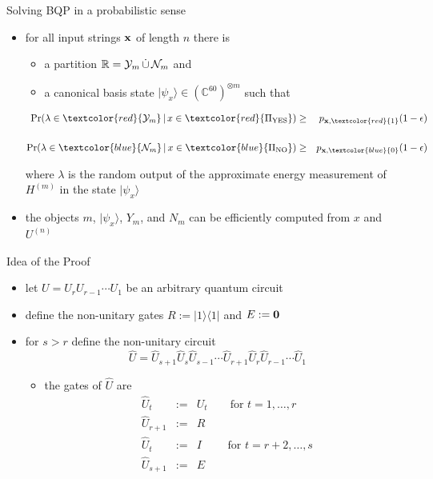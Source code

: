 \documentclass[slideColor]{prosper}
\newcommand{\C}{{\mathbb{C}}}
\renewcommand{\R}{{\mathbb{R}}}
\renewcommand{\>}{\rangle}
\newcommand{\<}{\langle}
\begin{document}
\begin{slide}{Solving BQP in a probabilistic sense}

\begin{itemize}
\item for all input strings ${\bf x}$ of length $n$ there is
  
  \begin{itemize}
  \item a partition $\R = {\cal Y}_m \, \dot{\cup} \, {\cal N}_m$ and

  \medskip
  \item a canonical basis state $|\psi_x\>\in(\C^{60})^{\otimes m}$ such that
  \end{itemize}
  \vspace{-0.5cm}
  \begin{eqnarray*}
  \Pr(\lambda\in \textcolor{red}{{\cal Y}_m}  \, | \, x\in \textcolor{red}{\Pi_{\rm YES}}) & \ge & p_{{\bf x}, \textcolor{red}{1}}  (1-\epsilon) \\ && \\
  \Pr(\lambda\in \textcolor{blue}{{\cal N}_m} \, | \, x\in \textcolor{blue}{\Pi_{\rm NO}}) & \ge & p_{{\bf x}, \textcolor{blue}{0}} (1-\epsilon) 
  \end{eqnarray*}

  where $\lambda$ is the random output of the approximate energy measurement of $H^{(m)}$ in the state $|\psi_x\>$
  
  \medskip
  \item
  the objects $m$, $|\psi_x\>$, $Y_m$, and $N_m$ can be efficiently computed from $x$ and $U^{(n)}$
\end{itemize}

\end{slide}


\begin{slide}{Idea of the Proof}
\begin{itemize}
\item let $U=U_r U_{r-1} \cdots U_1$ be an arbitrary quantum circuit 

\medskip
\item define the non-unitary gates $R:=|1\>\<1|$ and $E:={\bf 0}$ 

\medskip
\item for $s>r$ define the non-unitary circuit 
\[
\hat{U}=\hat{U}_{s+1}\hat{U}_s \hat{U}_{s-1} \cdots \hat{U}_{r+1} \hat{U}_r \hat{U}_{r-1} \cdots \hat{U}_1
\]
\begin{itemize}
\item the gates of $\hat{U}$ are 
\begin{eqnarray*}
\hat{U}_t     & := & U_t \quad\quad\mbox{for $t=1,\ldots,r$}    \\
\hat{U}_{r+1} & := & R                                          \\
\hat{U}_t     & := & I   \quad\quad\mbox{ for $t=r+2,\ldots,s$} \\
\hat{U}_{s+1} & := & E
\end{eqnarray*}
\end{itemize}
\end{itemize}
\end{slide}
\end{document}

